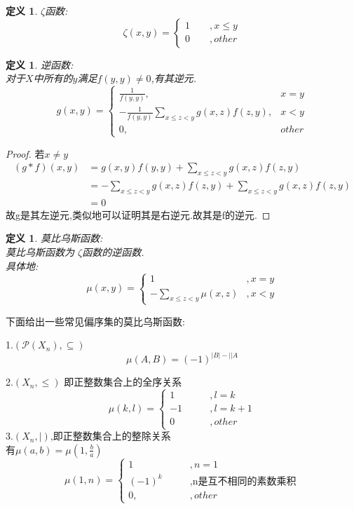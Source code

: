 \documentclass[12pt, a4paper, oneside]{ctexbook}
\newtheorem{definition}[theorem]{定义}
\newcommand{\newp}[1]{\vspace{#1\baselineskip}\noindent}
\begin{document}
\begin{definition}
$\zeta$函数:
$$
\zeta(x,y)=\begin{cases}1\qquad,x\leq y\\ 0\qquad,other\end{cases}
$$
\end{definition}


\begin{definition}
逆函数:\\
对于$X$中所有的$y$满足$f(y,y)\neq 0$,有其逆元.
$$
g(x,y)=\begin{cases}
  \frac{1}{f(y,y)} ,& x=y\\
  -\frac{1}{f(y,y)}\sum_{x\le z < y} g(x,z)f(z,y),&x< y\\
  0,&other
\end{cases}
$$
\end{definition}


\begin{proof}
  若$x\neq y$
  $$
  \begin{aligned}
  (g*f)(x,y)&=g(x,y)f(y,y)+\sum_{x \le z <y} g(x,z)f(z,y)\\
  &=-\sum_{x \le z <y} g(x,z)f(z,y)+\sum_{x \le z <y} g(x,z)f(z,y)\\
  &=0
  \end{aligned}
  $$
  故g是其左逆元,类似地可以证明其是右逆元.故其是f的逆元.
\end{proof}


\begin{definition}
  莫比乌斯函数:\\
  莫比乌斯函数为 $\zeta$函数的逆函数.\\
  具体地:
  $$
  \mu(x,y)=\begin{cases}
    1&,x=y\\
    -\sum_{x\leq z<y} \mu(x,z)& ,x<y
    \end{cases}
  $$
\end{definition}

\newp{3}

下面给出一些常见偏序集的莫比乌斯函数: 

1.$(\mathcal{P}(X_n),\subseteq)$ \\
\[
\mu(A,B)=(-1)^{|B|-||A}
\]

2.$(X_n,\le)$ 即正整数集合上的全序关系\\
\[
\mu(k,l)=\begin{cases}
  1&\qquad,l=k\\
  -1&\qquad,l=k+1\\
  0&\qquad,other
  \end{cases}
\]
3.$(X_n,|)$,即正整数集合上的整除关系\\
有$\mu(a,b)=\mu\left(1,\frac{b}{a}\right)$
\[
  \mu(1,n)=\begin{cases}
    1&\qquad,n=1\\
    (-1)^k&\qquad,\text{n是互不相同的素数乘积}\\
    0,&\qquad,other
    \end{cases}
\]
\end{document}
